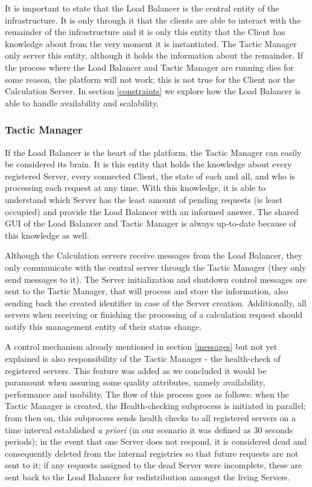 \documentclass[12pt]{article}
\begin{document}
It is important to state that the Load Balancer is the central entity of the infrastructure.
It is only through it that the clients are able to interact with the remainder of the infrastructure and it is only this entity that the Client has knowledge
about from the very moment it is instantiated.
The Tactic Manager only server this entity, although it holds the information about the remainder.
If the process where the Load Balancer and Tactic Manager are running dies for some reason, the platform will not work; this is not true for the Client nor the
Calculation Server.
In section \ref{constraints} we explore how the Load Balancer is able to handle availability and scalability.

\subsubsection{Tactic Manager}

If the Load Balancer is the heart of the platform, the Tactic Manager can easily be considered its brain.
It is this entity that holds the knowledge about every registered Server, every connected Client, the state of each and all, and who is processing each request
at any time.
With this knowledge, it is able to understand which Server has the least amount of pending requests (is least occupied) and provide the Load Balancer with an
informed answer.
The shared GUI of the Load Balancer and Tactic Manager is always up-to-date because of this knowledge as well.

Although the Calculation servers receive messages from the Load Balancer, they only communicate with the central server through the Tactic Manager (they only
send messages to it).
The Server initialization and shutdown control messages are sent to the Tactic Manager, that will process and store the information, also sending back the
created identifier in case of the Server creation.
Additionally, all servers when receiving or finishing the processing of a calculation request should notify this management entity of their status change.

A control mechanism already mentioned in section \ref{messages} but not yet explained is also responsibility of the Tactic Manager - the health-check of
registered servers.
This feature was added as we concluded it would be paramount when assuring some quality attributes, namely availability, performance and usability.
The flow of this process goes as follows: when the Tactic Manager is created, the Health-checking subprocess is initiated in parallel; from then on, this
subprocess sends health checks to all registered servers on a time interval established \textit{a priori} (in our scenario it was defined as 30 seconds periods);
in the event that one Server does not respond, it is considered dead and consequently deleted from the internal registries so that future requests are not sent
to it; if any requests assigned to the dead Server were incomplete, these are sent back to the Load Balancer for redistribution amongst the living Servers.
\end{document}
